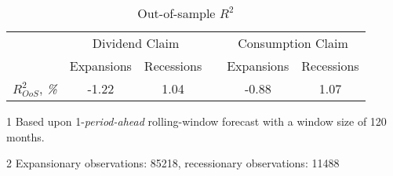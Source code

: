 \begin{table}[]
\centering
\caption{Out-of-sample $R^2$}
\label{tab:R2OS}
\begin{threeparttable}
\begin{tabular}{@{}lccccc@{}}
\toprule
                         & \multicolumn{2}{c}{Dividend Claim} && \multicolumn{2}{c}{Consumption Claim} \\ 
                         \addlinespace
& Expansions       & Recessions      && Expansions        & Recessions        \\
\cmidrule(lr){2-3} \cmidrule(lr){5-6}
$R^2_{OoS}$, \textit{\%} & -1.22            & 1.04            && -0.88             & 1.07              \\ \bottomrule
\end{tabular}
\begin{tablenotes}\footnotesize{
\item[1] Based upon 1-\textit{period-ahead} rolling-window forecast with a window size of 120 months.
\item[2] Expansionary observations: 85218, recessionary observations: 11488}
\end{tablenotes}
\end{threeparttable}
\end{table}